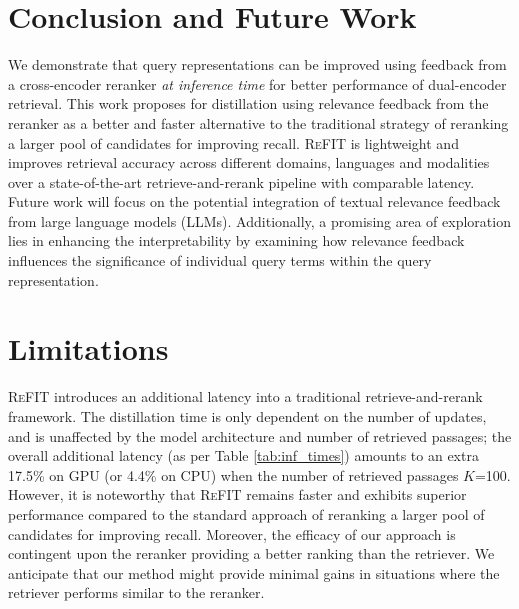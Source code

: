\documentclass[11pt]{article} %
\begin{document}








\section{Conclusion and Future Work}
We demonstrate that query representations can be improved using feedback from a cross-encoder reranker \textit{at inference time} for better performance of dual-encoder retrieval. This work proposes for distillation using relevance feedback from the reranker as a better and faster alternative to the traditional strategy of reranking a larger pool of candidates for improving recall.
\textsc{ReFIT} is lightweight and improves retrieval accuracy across different domains, languages and modalities over a state-of-the-art retrieve-and-rerank pipeline with comparable latency. Future work will focus on the potential integration of textual relevance feedback from large language models (LLMs). Additionally, a promising area of exploration lies in enhancing the interpretability by examining how relevance feedback influences the significance of individual query terms within the query representation.


\section{Limitations}

\textsc{ReFIT} introduces an additional latency into a traditional retrieve-and-rerank framework.
The distillation time is only dependent on the number of updates, and is unaffected by the model architecture  and number of retrieved passages; the overall additional latency (as per Table \ref{tab:inf_times}) amounts to an extra 17.5\% on GPU (or 4.4\% on CPU) when the number of retrieved passages $K$=100. However, it is noteworthy that \textsc{ReFIT} remains faster and exhibits superior performance compared to the standard approach of reranking a larger pool of candidates for improving recall.
Moreover, the efficacy of our approach is contingent upon the reranker providing a better ranking than the retriever. We anticipate that our method might provide minimal gains in situations where the retriever performs similar to the reranker.




\end{document}
